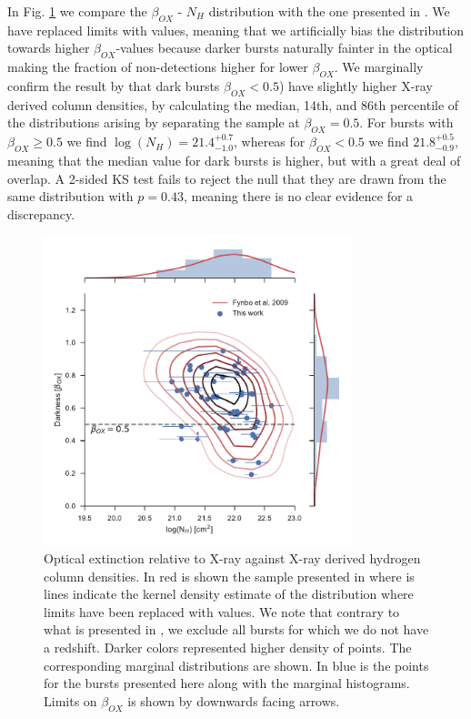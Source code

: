 \documentclass{aa}    %
\begin{document}
In Fig. \ref{fig:betaOX} we compare the $\beta_{OX}$ - $N_H$ distribution with
the one presented in \citet{Fynbo2009}. We have replaced limits with values,
meaning that we artificially bias the distribution towards higher
$\beta_{OX}$-values because darker bursts naturally fainter in the optical
making the fraction of non-detections higher for lower $\beta_{OX}$. We
marginally confirm the result by \citet{Fynbo2009} that dark bursts $\beta_{OX}
< 0.5$) have slightly higher X-ray derived column densities, by calculating the
median, 14th, and 86th percentile of the distributions arising by separating the
sample at $\beta_{OX} = 0.5$. For bursts with $\beta_{OX} \geq 0.5$ we find
$\log(N_H) = 21.4_{-1.0}^{+0.7}$, whereas for $\beta_{OX} < 0.5$ we find
$21.8_{-0.9}^{+0.5}$, meaning that the median value for dark bursts is higher,
but with a great deal of overlap. A 2-sided KS test fails to reject the null
that they are drawn from the same distribution with $p = 0.43$, meaning there is
no clear evidence for a discrepancy.

\begin{figure}
	\centerline{\includegraphics[width=9cm]{figures/betaOX.pdf}} \caption{Optical
	extinction relative to X-ray against X-ray derived hydrogen column densities.
	In red is shown the sample presented in \citet{Fynbo2009} where is lines
	indicate the kernel density estimate of the distribution where limits have been
	replaced with values. We note that contrary to what is presented in
	\citet{Fynbo2009}, we exclude all bursts for which we do not have a redshift.
	Darker colors represented higher density of points. The corresponding marginal
	distributions are shown. In blue is the points for the bursts presented here
	along with the marginal histograms. Limits on $\beta_{OX}$ is shown by
	downwards facing arrows.} \label{fig:betaOX}
\end{figure}
\end{document}
